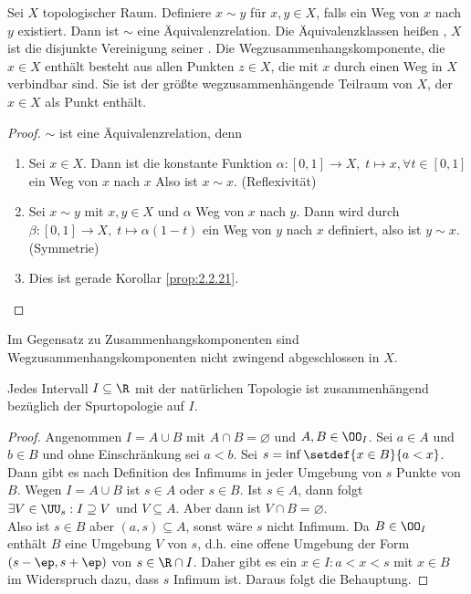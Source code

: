 \begin{defn}
\label{defn:2.2.22}
Sei $X$ topologischer Raum. Definiere $x\sim y$ für $x,y\in X$, falls ein Weg
von $x$ nach $y$ existiert. Dann ist $\sim$ eine Äquivalenzrelation. Die
Äquivalenzklassen heißen \emph{\wzhk}, $X$ ist die
disjunkte Vereinigung seiner \wzhk. Die Wegzusammenhangskomponente, die $x\in X$
enthält besteht aus allen Punkten $z\in X$, die mit $x$ durch einen Weg in $X$
verbindbar sind. Sie ist der größte wegzusammenhängende Teilraum von $X$, der
$x\in X$ als Punkt enthält.\fishhere
\end{defn}
\begin{proof}
$\sim$ ist eine Äquivalenzrelation, denn
\begin{enumerate}
  \item Sei $x\in X$. Dann ist die konstante Funktion $\alpha: [0,1]\to X,\;
  t\mapsto x, \forall t\in[0,1]$ ein Weg von $x$ nach $x$ Also ist $x\sim x$.
  (Reflexivität)
  \item Sei $x\sim y$ mit $x,y\in X$ und $\alpha$ Weg von $x$ nach $y$. Dann
  wird durch $\beta: [0,1]\to X,\;t\mapsto \alpha(1-t)$ ein Weg von $y$ nach
  $x$ definiert, also ist $y\sim x$. (Symmetrie)
  \item Dies ist gerade Korollar \ref{prop:2.2.21}.\qedhere
\end{enumerate}
\end{proof}

\begin{bemn}[Warnung:]
Im Gegensatz zu Zusammenhangskomponenten sind Wegzusammenhangskomponenten nicht
zwingend abgeschlossen in $X$.\maphere
\end{bemn}

\begin{lem}
\label{prop:2.2.23}
Jedes Intervall $I\subseteq\R$ mit der natürlichen Topologie ist zusammenhängend
bezüglich der Spurtopologie auf $I$.\fishhere
\end{lem}
\begin{proof}
Angenommen $I=A\cup B$ mit $A\cap B = \varnothing$ und $A,B\in\OO_I$. Sei $a\in
A$ und $b\in B$ und ohne Einschränkung sei $a<b$. Sei $s=\inf \setdef{x\in
B}{a<x}$. Dann gibt es nach Definition des Infimums in jeder Umgebung von $s$
Punkte von $B$. Wegen $I = A\cup B$ ist $s\in A$ oder $s\in B$. Ist $s\in A$,
dann folgt $\exists V\in\UU_s : I\supseteq V$ und $V\subseteq A$. Aber dann ist
$V\cap B = \varnothing$.\dipper\\
Also ist $s\in B$ aber $(a,s)\subseteq A$, sonst wäre $s$ nicht Infimum. Da
$B\in\OO_I$ enthält $B$ eine Umgebung $V$ von $s$, d.h. eine offene Umgebung
der Form $(s-\ep,s+\ep)$ von $s\in \R\cap I$. Daher gibt es ein $x\in I: a<x<s$
mit $x\in B$ im Widerspruch dazu, dass $s$ Infimum ist. Daraus folgt die
Behauptung.\qedhere
\end{proof}

